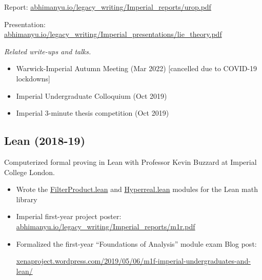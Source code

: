 \documentclass{article}
\newenvironment{relatedwork}
   {
     \begin{mdframed}[
       leftmargin=1cm,
       rightmargin=0cm,
       innerleftmargin=10pt,
       innerrightmargin=0pt,
       innertopmargin=0.5em,
       innerbottommargin=0.5em,
       linewidth=1pt,
       linecolor=gray,
       topline=false,
       bottomline=false,
       rightline=false
     ]
     \footnotesize
   }
   {
     \end{mdframed}
   }
\begin{document}
Report: \href{https://abhimanyu.io/legacy_writing/Imperial_reports/urop.pdf}{abhimanyu.io/legacy\_writing/Imperial\_reports/urop.pdf}

Presentation: \href{https://abhimanyu.io/legacy_writing/Imperial_presentations/lie_theory.pdf}{abhimanyu.io/legacy\_writing/Imperial\_presentations/lie\_theory.pdf}

\begin{relatedwork}
    \emph{Related write-ups and talks.}
    \begin{itemize}[label=—]
        \item Warwick-Imperial Autumn Meeting (Mar 2022) [cancelled due to COVID-19 lockdowns]
        \item Imperial Undergraduate Colloquium (Oct 2019)
        \item Imperial 3-minute thesis competition (Oct 2019)
    \end{itemize}
\end{relatedwork}


\subsection*{Lean (2018-19)}

Computerized formal proving in Lean with Professor Kevin Buzzard at Imperial College London.

\begin{itemize}
    \item Wrote the \href{https://github.com/leanprover-community/mathlib4/blob/3a7e6bb77ec51d8009107923a4c071a9473ecc5c/Mathlib/Order/Filter/FilterProduct.lean}{FilterProduct.lean} and \href{https://github.com/leanprover-community/mathlib4/blob/3a7e6bb77ec51d8009107923a4c071a9473ecc5c/Mathlib/Data/Real/Hyperreal.lean}{Hyperreal.lean} modules for the Lean math library
    \item Imperial first-year project poster: \href{https://abhimanyu.io/legacy_writing/Imperial_reports/m1r.pdf}{abhimanyu.io/legacy\_writing/Imperial\_reports/m1r.pdf}
    \item Formalized the first-year ``Foundations of Analysis'' module exam Blog post:

          \href{https://xenaproject.wordpress.com/2019/05/06/m1f-imperial-undergraduates-and-lean/}{xenaproject.wordpress.com/2019/05/06/m1f-imperial-undergraduates-and-lean/}
\end{itemize}
\end{document}
